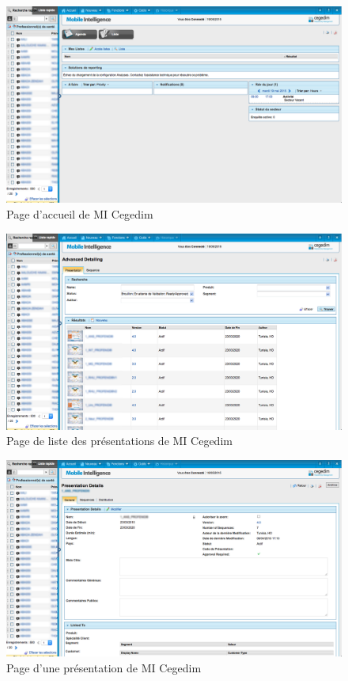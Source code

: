 \documentclass[12pt, ChapStyle1, oneside]{./Styles/Dea_Gsm}
\begin{document}
\begin{figure}[H]
    \centering
    \includegraphics[width=5.5in]{cegedim/web1}
    \caption{Page d'accueil de MI Cegedim}
    \label{Scrum}
\end{figure}

\begin{figure}[H]
    \centering
    \includegraphics[width=5.5in]{cegedim/web2}
    \caption{Page de liste des présentations de MI Cegedim}
    \label{Scrum}
\end{figure}

\begin{figure}[H]
    \centering
    \includegraphics[width=5.5in]{cegedim/web3}
    \caption{Page d'une présentation de MI Cegedim}
    \label{Scrum}
\end{figure}
\end{document}
